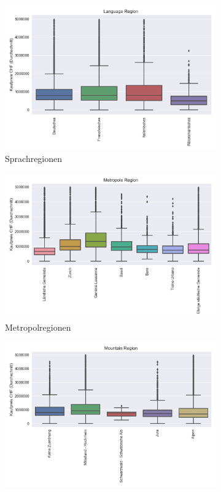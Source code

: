 \begin{figure}[h]
\begin{subfigure}{.5\textwidth}
  \includegraphics[width=\linewidth]{images/anhang/analysis/boxplot_language_region_id.png}
  \caption{Sprachregionen} 
\end{subfigure}
\begin{subfigure}{.5\textwidth}
  \centering
  \includegraphics[width=\linewidth]{images/anhang/analysis/boxplot_metropole_region_id.png}
  \caption{Metropolregionen}
\end{subfigure}
\begin{subfigure}{.5\textwidth}
  \centering
  \includegraphics[width=\linewidth]{images/anhang/analysis/boxplot_mountain_region_id.png}

\end{subfigure}
\end{figure}
